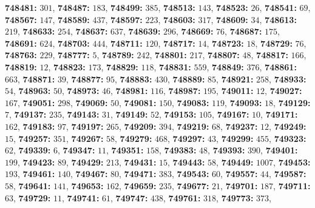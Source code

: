 \textsf{\bfseries 748481:} $301$, \textsf{\bfseries 748487:} $183$, \textsf{\bfseries 748499:} $385$, \textsf{\bfseries 748513:} $143$, \textsf{\bfseries 748523:} $26$, \textsf{\bfseries 748541:} $69$, \textsf{\bfseries 748567:} $147$, \textsf{\bfseries 748589:} $437$, \textsf{\bfseries 748597:} $223$, \textsf{\bfseries 748603:} $317$, \textsf{\bfseries 748609:} $34$, \textsf{\bfseries 748613:} $219$, \textsf{\bfseries 748633:} $254$, \textsf{\bfseries 748637:} $637$, \textsf{\bfseries 748639:} $296$, \textsf{\bfseries 748669:} $76$, \textsf{\bfseries 748687:} $175$, \textsf{\bfseries 748691:} $624$, \textsf{\bfseries 748703:} $444$, \textsf{\bfseries 748711:} $120$, \textsf{\bfseries 748717:} $14$, \textsf{\bfseries 748723:} $18$, \textsf{\bfseries 748729:} $76$, \textsf{\bfseries 748763:} $229$, \textsf{\bfseries 748777:} $5$, \textsf{\bfseries 748789:} $242$, \textsf{\bfseries 748801:} $217$, \textsf{\bfseries 748807:} $48$, \textsf{\bfseries 748817:} $166$, \textsf{\bfseries 748819:} $12$, \textsf{\bfseries 748823:} $173$, \textsf{\bfseries 748829:} $118$, \textsf{\bfseries 748831:} $559$, \textsf{\bfseries 748849:} $376$, \textsf{\bfseries 748861:} $663$, \textsf{\bfseries 748871:} $39$, \textsf{\bfseries 748877:} $95$, \textsf{\bfseries 748883:} $430$, \textsf{\bfseries 748889:} $85$, \textsf{\bfseries 748921:} $258$, \textsf{\bfseries 748933:} $54$, \textsf{\bfseries 748963:} $50$, \textsf{\bfseries 748973:} $46$, \textsf{\bfseries 748981:} $116$, \textsf{\bfseries 748987:} $195$, \textsf{\bfseries 749011:} $12$, \textsf{\bfseries 749027:} $167$, \textsf{\bfseries 749051:} $298$, \textsf{\bfseries 749069:} $50$, \textsf{\bfseries 749081:} $150$, \textsf{\bfseries 749083:} $119$, \textsf{\bfseries 749093:} $18$, \textsf{\bfseries 749129:} $7$, \textsf{\bfseries 749137:} $235$, \textsf{\bfseries 749143:} $31$, \textsf{\bfseries 749149:} $52$, \textsf{\bfseries 749153:} $105$, \textsf{\bfseries 749167:} $10$, \textsf{\bfseries 749171:} $162$, \textsf{\bfseries 749183:} $97$, \textsf{\bfseries 749197:} $265$, \textsf{\bfseries 749209:} $394$, \textsf{\bfseries 749219:} $68$, \textsf{\bfseries 749237:} $12$, \textsf{\bfseries 749249:} $15$, \textsf{\bfseries 749257:} $351$, \textsf{\bfseries 749267:} $58$, \textsf{\bfseries 749279:} $468$, \textsf{\bfseries 749297:} $43$, \textsf{\bfseries 749299:} $455$, \textsf{\bfseries 749323:} $62$, \textsf{\bfseries 749339:} $6$, \textsf{\bfseries 749347:} $11$, \textsf{\bfseries 749351:} $158$, \textsf{\bfseries 749383:} $48$, \textsf{\bfseries 749393:} $390$, \textsf{\bfseries 749401:} $199$, \textsf{\bfseries 749423:} $89$, \textsf{\bfseries 749429:} $213$, \textsf{\bfseries 749431:} $15$, \textsf{\bfseries 749443:} $58$, \textsf{\bfseries 749449:} $1007$, \textsf{\bfseries 749453:} $193$, \textsf{\bfseries 749461:} $140$, \textsf{\bfseries 749467:} $80$, \textsf{\bfseries 749471:} $383$, \textsf{\bfseries 749543:} $60$, \textsf{\bfseries 749557:} $44$, \textsf{\bfseries 749587:} $58$, \textsf{\bfseries 749641:} $141$, \textsf{\bfseries 749653:} $162$, \textsf{\bfseries 749659:} $235$, \textsf{\bfseries 749677:} $21$, \textsf{\bfseries 749701:} $187$, \textsf{\bfseries 749711:} $63$, \textsf{\bfseries 749729:} $11$, \textsf{\bfseries 749741:} $61$, \textsf{\bfseries 749747:} $438$, \textsf{\bfseries 749761:} $318$, \textsf{\bfseries 749773:} $373$, 
